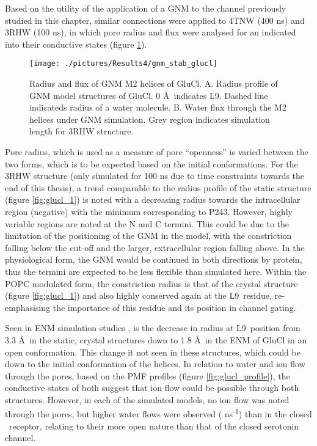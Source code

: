 Based on the utility of the application of a GNM to the channel previously studied in this chapter, similar connections were applied to 4TNW (400 ns) and 3RHW (100 ns), in which pore radius and flux were analysed for an indicated into their conductive states (figure \ref{fig:gnm_stab_glucl}). 

\begin{figure}[H]
\begin{center}
\texttt{[image: ./pictures/Results4/gnm\_stab\_glucl]}
\caption[Radius and flux of GNM M2 helices of GluCl.] {Radius and flux of GNM M2 helices of GluCl. A. Radius profile of GNM model structures of GluCl. 0 \AA\ indicates L9\textquotesingle. Dashed line indicateds radius of a water molecule. B. Water flux through the M2 helices under GNM simulation. Grey region indicates simulation length for 3RHW structure.}
\label{fig:gnm_stab_glucl}
\end{center}
\end{figure}

Pore radius, which is used as a measure of pore ``openness'' is varied between the two forms, which is to be expected based on the initial conformations. For the 3RHW structure (only simulated for 100 ns due to time constraints towards the end of this thesis), a trend comparable to the radius profile of the static structure (figure \ref{fig:glucl_1}) is noted with a decreasing radius towards the intracellular region (negative) with the minimum corresponding to P243. However, highly variable regions are noted at the N and C termini. This could be due to the limitation of the positioning of the GNM in the model, with the constriction falling below the cut-off and the larger, extracellular region falling above. In the physiological form, the GNM would be continued in both directions by protein, thus the termini are expected to be less flexible than simulated here. Within the POPC modulated form, the constriction radius is that of the crystal structure (figure \ref{fig:glucl_1}) and also highly conserved again at the L9\textquotesingle\ residue, re-emphasising the importance of this residue and its position in channel gating.  

Seen in ENM simulation studies \cite{Cheng2012}, is the decrease in radius at L9\textquotesingle\ position from 3.3 \AA\ in the static, crystal structures down to 1.8 \AA\ in the ENM of GluCl in an open conformation. This change it not seen in these structures, which could be down to the initial conformation of the helices. In relation to water and ion flow through the pores, based on the PMF profiles (figure \ref{fig:glucl_profile}), the conductive states of both suggest that ion flow could be possible through both structures. However, in each of the simulated models, no ion flow was noted through the pores, but higher water flows  were observed ( ns\textsuperscript{-1}) than in the closed \HT\ receptor, relating to their more open nature than that of the closed serotonin channel. 

